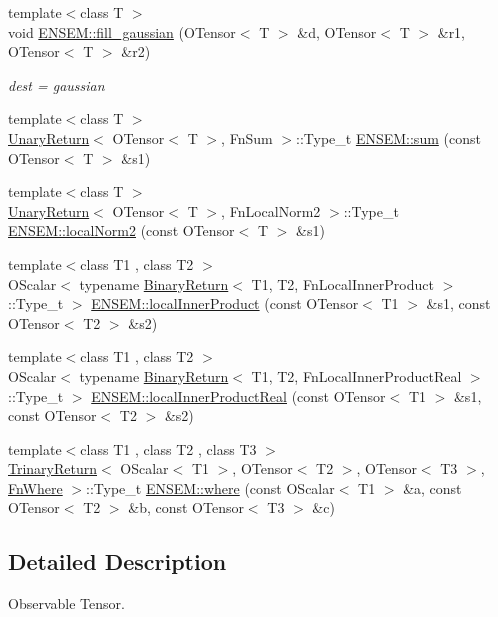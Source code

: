 \begin{DoxyCompactItemize}
{\footnotesize template$<$class T $>$ }\\void \mbox{\hyperlink{group__obstensor_ga5461ae19cc6cfc4271fe13264bbda77d}{E\+N\+S\+E\+M\+::fill\+\_\+gaussian}} (O\+Tensor$<$ T $>$ \&d, O\+Tensor$<$ T $>$ \&r1, O\+Tensor$<$ T $>$ \&r2)
\begin{DoxyCompactList}\small\item\em dest = gaussian \end{DoxyCompactList}\item 
{\footnotesize template$<$class T $>$ }\\\mbox{\hyperlink{structUnaryReturn}{Unary\+Return}}$<$ O\+Tensor$<$ T $>$, Fn\+Sum $>$\+::Type\+\_\+t \mbox{\hyperlink{group__obstensor_ga83a9795df4ff312d25e7971ff02b5e8b}{E\+N\+S\+E\+M\+::sum}} (const O\+Tensor$<$ T $>$ \&s1)
\item 
{\footnotesize template$<$class T $>$ }\\\mbox{\hyperlink{structUnaryReturn}{Unary\+Return}}$<$ O\+Tensor$<$ T $>$, Fn\+Local\+Norm2 $>$\+::Type\+\_\+t \mbox{\hyperlink{group__obstensor_ga4d3ab927a59e8e7e944243bad78ea1fd}{E\+N\+S\+E\+M\+::local\+Norm2}} (const O\+Tensor$<$ T $>$ \&s1)
\item 
{\footnotesize template$<$class T1 , class T2 $>$ }\\O\+Scalar$<$ typename \mbox{\hyperlink{structBinaryReturn}{Binary\+Return}}$<$ T1, T2, Fn\+Local\+Inner\+Product $>$\+::Type\+\_\+t $>$ \mbox{\hyperlink{group__obstensor_gaffb6c3d07f9c4ba10a5712ce49725d68}{E\+N\+S\+E\+M\+::local\+Inner\+Product}} (const O\+Tensor$<$ T1 $>$ \&s1, const O\+Tensor$<$ T2 $>$ \&s2)
\item 
{\footnotesize template$<$class T1 , class T2 $>$ }\\O\+Scalar$<$ typename \mbox{\hyperlink{structBinaryReturn}{Binary\+Return}}$<$ T1, T2, Fn\+Local\+Inner\+Product\+Real $>$\+::Type\+\_\+t $>$ \mbox{\hyperlink{group__obstensor_ga39e2368c90f850b08cd366076195fbc4}{E\+N\+S\+E\+M\+::local\+Inner\+Product\+Real}} (const O\+Tensor$<$ T1 $>$ \&s1, const O\+Tensor$<$ T2 $>$ \&s2)
\item 
{\footnotesize template$<$class T1 , class T2 , class T3 $>$ }\\\mbox{\hyperlink{structTrinaryReturn}{Trinary\+Return}}$<$ O\+Scalar$<$ T1 $>$, O\+Tensor$<$ T2 $>$, O\+Tensor$<$ T3 $>$, \mbox{\hyperlink{structFnWhere}{Fn\+Where}} $>$\+::Type\+\_\+t \mbox{\hyperlink{group__obstensor_ga11064bec720719323becc2499a52e251}{E\+N\+S\+E\+M\+::where}} (const O\+Scalar$<$ T1 $>$ \&a, const O\+Tensor$<$ T2 $>$ \&b, const O\+Tensor$<$ T3 $>$ \&c)
\end{DoxyCompactItemize}


\subsection{Detailed Description}
Observable Tensor. 

